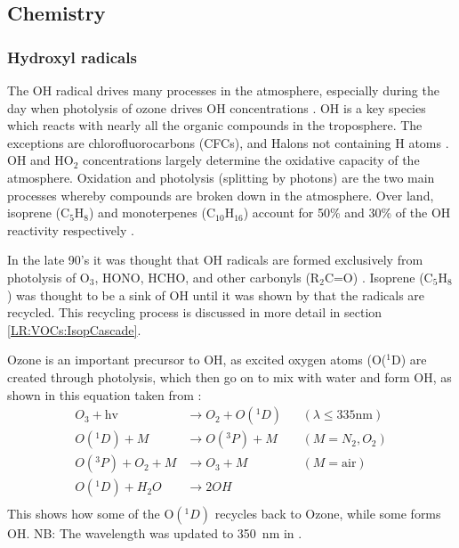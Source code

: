   \subsection{Chemistry}
  \label{LR:Atmos:Chem}
    \subsubsection{Hydroxyl radicals}
      The OH radical drives many processes in the atmosphere, especially during the day when photolysis of ozone drives OH concentrations \citep{Atkinson2000}.    
      OH is a key species which reacts with nearly all the organic compounds in the troposphere.
      The exceptions are chlorofluorocarbons (CFCs), and Halons not containing H atoms \citep{Atkinson2000}.
      OH and HO$_2$ concentrations largely determine the oxidative capacity of the atmosphere.
      Oxidation and photolysis (splitting by photons) are the two main processes whereby compounds are broken down in the atmosphere.
      Over land, isoprene (C$_5$H$_8$) and monoterpenes (C$_10$H$_16$) account for 50\% and 30\% of the OH reactivity respectively \citep{Fuentes2000}.
      
      In the late 90's it was thought that OH radicals are formed exclusively from photolysis of O$_3$, HONO, HCHO, and other carbonyls (R$_2$C=O) \cite{Atkinson2000}.
      Isoprene (C$_5$H$_8$) was thought to be a sink of OH until it was shown by \cite{Paulot2009b} that the radicals are recycled.
      This recycling process is discussed in more detail in section \ref{LR:VOCs:IsopCascade}.
      
      Ozone is an important precursor to OH, as excited oxygen atoms (O(${}^1$D) are created through photolysis, which then go on to mix with water and form OH, as shown in this equation taken from \cite{Atkinson2000}:
      \begin{equation}
      \begin{aligned}
      O_3 + \text{hv}         & \to  O_2 + O({}^1D)   && (\lambda \le 335 \text{nm}) \\%
      O({}^1D) + M            & \to  O({}^3P) + M     && (M=N_2, O_2)               \\%
      O({}^3P) + O_2 + M      & \to  O_3 + M          && (M=\text{air})             \\%
      O({}^1D) + H_2O         & \to  2OH              &&                            \\%
      \end{aligned}
      \label{LR:Atmos:Chem:eqn_O3toOH}
      \end{equation}
      This shows how some of the O$({}^1D)$ recycles back to Ozone, while some forms OH.
      NB: The wavelength was updated to 350~nm in \cite{AtkinsonArey2003}.
      
